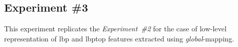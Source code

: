 
\subsection{Experiment \#3}\label{subsec:exp3}
%
%
%
%

This experiment replicates the \emph{Experiment~\#2} for the case of low-level representation of \ac{lbp} and \ac{lbptop} features extracted using \emph{global}-mapping.


